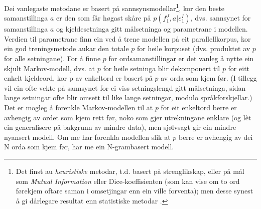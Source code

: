 \documentclass[11pt,a4paper,oneside,draft]{book}
\begin{document}
 Dei vanlegaste metodane er basert på sannsynsmodellar\footnote{Det finst au \emph{heuristiske} metodar, t.d. basert på
        strenglikskap, eller på mål som \emph{Mutual Information} eller
        Dice-koeffisienten (som kan vise om to ord førekjem oftare
        saman i omsetjingar enn ein ville forventa); men desse synest
        å gi dårlegare resultat enn statistiske metodar
        \citep{och2003scv}. }, kor den
 beste samanstillinga $a$ er den som får høgast skåre på
 $p(f_1^J,a|e_1^I)$, dvs. sannsynet for samanstillinga $a$ og
 kjeldesetninga gitt målsetninga og parametrane i modellen. Verdien
 til parametrane finn ein ved å trene modellen på eit parallellkorpus,
 kor ein god treningsmetode aukar den totale $p$ for heile korpuset
 (dvs. produktet av $p$ for alle setningane).  For å finne $p$ for
 ordsamanstillingar er det vanleg å nytte ein skjult Markov-modell,
 dvs. at $p$ for heile setninga blir dekomponert til $p$ for eitt
 enkelt kjeldeord, kor p av enkeltord er basert på $p$ av orda som
 kjem før. (I tillegg vil ein ofte vekte på sannsynet for ei viss
 setningslengd gitt målsetninga, sidan lange setningar ofte blir
 omsett til like lange setningar, modulo språkforskjellar.) Det er
 mogleg å forenkle Markov-modellen til at $p$ for eit enkeltord berre
 er avhengig av ordet som kjem rett før, noko som gjer utrekningane
 enklare (og lèt ein generalisere på bakgrunn av mindre data), men
 sjølvsagt gir ein mindre nyansert modell. Om me har forenkla modellen
 slik at $p$ berre er avhengig av dei N orda som kjem før, har me ein
 N-grambasert modell.
 
\end{document}
